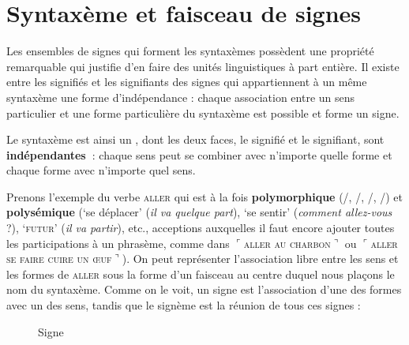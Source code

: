 \section{Syntaxème et faisceau de signes}\label{sec:2.3.17}

Les ensembles de signes qui forment les syntaxèmes possèdent une propriété remarquable qui justifie d’en faire des unités linguistiques à part entière. Il existe entre les signifiés et les signifiants des signes qui appartiennent à un même syntaxème une forme d’indépendance : chaque association entre un sens particulier et une forme particulière du syntaxème est possible et forme un signe.

{Le syntaxème est ainsi un , dont les deux faces, le signifié et le signifiant, sont \textbf{indépendantes~}: chaque sens peut se combiner avec n’importe quelle forme et chaque forme avec n’importe quel sens.}

Prenons l’exemple du verbe \textsc{aller} qui est à la fois \textbf{polymorphique} (/, /, /, /) et \textbf{polysémique} (‘se déplacer’ (\textit{il va quelque part}), ‘se sentir’ (\textit{comment allez-vous} ?), ‘\textsc{futur}’ (\textit{il va partir}), etc., acceptions auxquelles il faut encore ajouter toutes les participations à un phrasème, comme dans $⌜$\textsc{aller} \textsc{au} \textsc{charbon}$⌝$ ou $⌜$\textsc{aller} \textsc{se} \textsc{faire} \textsc{cuire} \textsc{un} \textsc{œuf}$⌝$). On peut représenter l’association libre entre les sens et les formes de \textsc{aller} sous la forme d’un faisceau au centre duquel nous plaçons le nom du syntaxème. Comme on le voit, un signe est l’association d’une des formes avec un des sens, tandis que le signème est la réunion de tous ces signes :

\begin{figure}
\caption{Signe\label{fig:}}
\end{figure}

